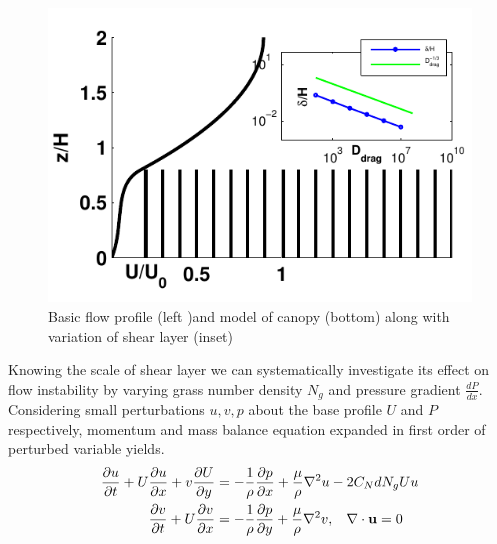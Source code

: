 \documentclass[aps,twocolumn,floatfix,prl,10pt]{revtex4-1}
\newcommand{\bu}{\mathbf{u}}
\newcommand{\del}{\partial}
\begin{document}
\begin{figure}[htb!]
  \includegraphics[scale=0.8]{fig1}
\caption{Basic flow profile (left )and model of canopy (bottom) along with variation of shear layer (inset) }
\end{figure}
Knowing the scale of shear layer we can systematically investigate its effect on flow instability
by varying grass number density $N_g$ and pressure gradient $\frac{dP}{dx}$. Considering small perturbations $u, v, p$ about the base profile $U$ and $P$
respectively, momentum and mass balance equation expanded in first order of perturbed variable yields.
\begin{equation}
\begin{split}
\frac{\del u}{\del t}+U\frac{\del u}{\del x}+v\frac{\del U}{\del y} &= -\frac{1}{\rho}\frac{\del p}{\del x}+\frac{\mu}{\rho}\nabla^2u-2C_{N}dN_{g}Uu\\
\frac{\del v}{\del  t}+ U\frac{\del v}{\del x} &= -\frac{1}{\rho}\frac{\del p}{\del y}+\frac{\mu}{\rho}\nabla^2v, \hspace{0.3cm} \nabla\cdot\bu=0\\
\end{split}
\end{equation}
\end{document}
